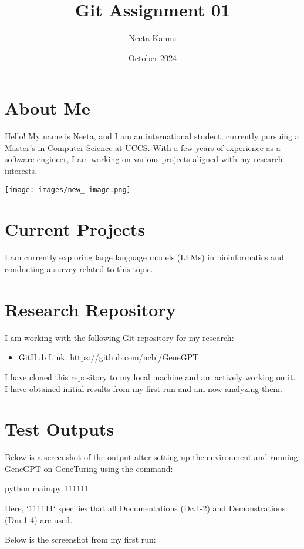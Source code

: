 ﻿\documentclass{article}
\title{Git Assignment 01}
\author{Neeta Kannu}
\date{October 2024}
\begin{document}
\maketitle

\section*{About Me}
Hello! My name is Neeta, and I am an international student, currently pursuing a Master's in Computer Science at UCCS. With a few years of experience as a software engineer, I am working on various projects aligned with my research interests.

\begin{center}
    \texttt{[image: images/new\_ image.png]}
\end{center}

\section*{Current Projects}
I am currently exploring large language models (LLMs) in bioinformatics and conducting a survey related to this topic.

\section*{Research Repository}
I am working with the following Git repository for my research:

\begin{itemize}
    \item GitHub Link: \url{https://github.com/ncbi/GeneGPT}
\end{itemize}

I have cloned this repository to my local machine and am actively working on it. 
I have obtained initial results from my first run and am now analyzing them.

\section*{Test Outputs}
Below is a screenshot of the output after setting up the environment and running GeneGPT on GeneTuring using the command:

python main.py 111111

Here, `111111` specifies that all Documentations (Dc.1-2) and Demonstrations (Dm.1-4) are used.

Below is the screenshot from my first run:
\end{document}

